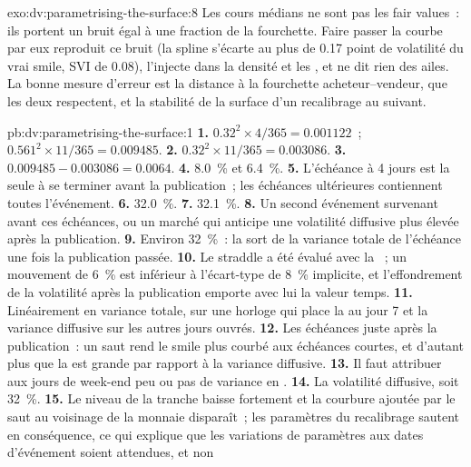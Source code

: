 \begin{solution}{exo:dv:parametrising-the-surface:8}
Les cours médians ne sont pas les fair values~: ils portent un bruit égal à une fraction de la fourchette. Faire passer la courbe par eux
reproduit ce bruit (la spline s'écarte au plus de 0.17 point de volatilité du vrai smile, SVI de 0.08), l'injecte dans
la densité et les , et ne dit rien des ailes. La bonne mesure d'erreur est la distance à la
fourchette acheteur--vendeur, que les deux respectent, et la stabilité de la surface d'un recalibrage au suivant.
\end{solution}

\begin{solution}{pb:dv:parametrising-the-surface:1}
\textbf{1.} $0.32^2\times4/365=0.001122$~; $0.561^2\times11/365=0.009485$.
\textbf{2.} $0.32^2\times11/365=0.003086$.
\textbf{3.} $0.009485-0.003086=0.0064$.
\textbf{4.} 8.0~\% et 6.4~\%.
\textbf{5.} L'échéance à 4 jours est la seule à se terminer avant la publication~; les échéances ultérieures contiennent toutes
l'événement.
\textbf{6.} 32.0~\%.
\textbf{7.} 32.1~\%.
\textbf{8.} Un second événement survenant avant ces échéances, ou un marché qui anticipe une volatilité diffusive plus élevée
après la publication.
\textbf{9.} Environ 32~\%~: la  sort de la variance totale de l'échéance une fois la publication passée.
\textbf{10.} Le straddle a été évalué avec la ~; un mouvement de 6~\% est inférieur à l'écart-type de 8~\%
implicite, et l'effondrement de la volatilité après la publication emporte avec lui la valeur temps.
\textbf{11.} Linéairement en variance totale, sur une horloge qui place la  au jour 7 et la
variance diffusive sur les autres jours ouvrés.
\textbf{12.} Les échéances juste après la publication~: un saut rend le smile plus courbé aux échéances courtes,
et d'autant plus que la  est grande par rapport à la variance diffusive.
\textbf{13.} Il faut attribuer aux jours de week-end peu ou pas de variance en .
\textbf{14.} La volatilité diffusive, soit 32~\%.
\textbf{15.} Le niveau de la tranche baisse fortement et la courbure ajoutée par le saut au voisinage de la monnaie disparaît~;
les paramètres du recalibrage sautent en conséquence, ce qui explique que les variations de paramètres aux dates d'événement soient attendues, et non

\end{solution}
